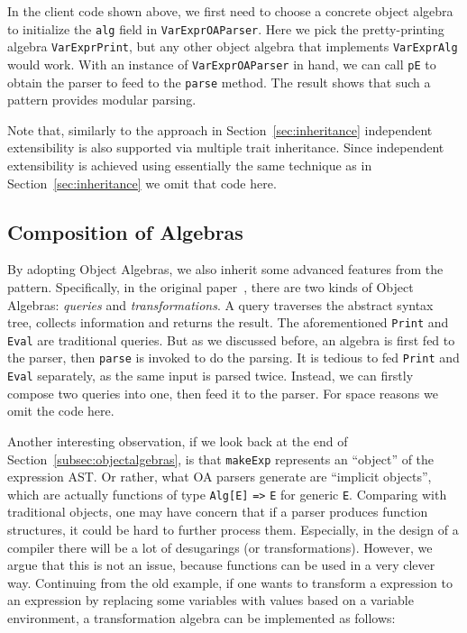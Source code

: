 In the client code shown above, we first need to choose a concrete
object algebra to initialize the \lstinline{alg} field in \lstinline{VarExprOAParser}. Here we pick the
pretty-printing algebra \lstinline{VarExprPrint}, but any other object
algebra that implements \lstinline{VarExprAlg} would work.
With an instance of \lstinline{VarExprOAParser} in hand, we can call
\lstinline{pE} to obtain the parser to feed to the \lstinline{parse} method.
The result shows that such a pattern provides modular parsing.

Note that, similarly to the approach in Section~\ref{sec:inheritance} independent extensibility is also supported via multiple trait inheritance.
Since independent extensibility is achieved using essentially the same technique as in Section~\ref{sec:inheritance} we omit that code here.

\subsection{Composition of Algebras}\label{subsec:more-oa}
By adopting Object Algebras, we also inherit some advanced features from the pattern. Specifically, in the original paper~\cite{Oliveira:2012}, there are two kinds of Object Algebras: \textit{queries} and \textit{transformations}. A query traverses the abstract syntax tree, collects information and returns the result. The aforementioned \lstinline{Print} and \lstinline{Eval} are traditional queries. But as we discussed before, an algebra is first fed to the parser, then \lstinline{parse} is invoked to do the parsing. It is tedious to fed \lstinline{Print} and \lstinline{Eval} separately, as the same input is parsed twice. Instead, we can firstly compose two queries into one, then feed it to the parser. For space reasons we omit the code here.

Another interesting observation, if we look back at the end of Section~\ref{subsec:objectalgebras}, is that \lstinline{makeExp} represents an ``object'' of the expression AST. Or rather, what OA parsers generate are ``implicit objects'', which are actually functions of type \lstinline{Alg[E]} \lstinline{=>} \lstinline{E} for generic \lstinline{E}. Comparing with traditional objects, one may have concern that if a parser produces function structures, it could be hard to further process them. Especially, in the design of a compiler
there will be a lot of desugarings (or transformations). However, we argue that this is not an issue, because functions can be used
in a very clever way. Continuing from the old example, if one wants to transform a  expression to an  expression by
replacing some variables with values based on a variable environment, a transformation algebra can be implemented as follows:

